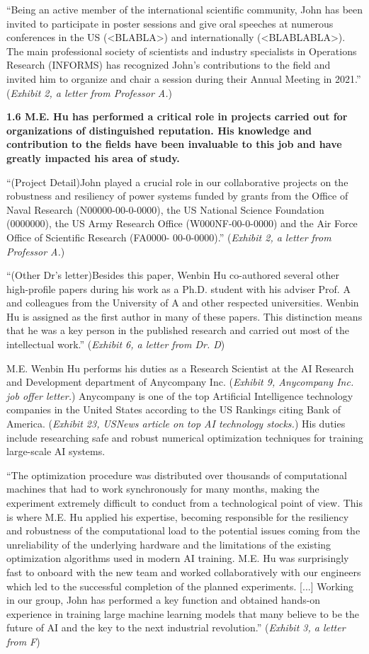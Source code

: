 \documentclass{article}
\begin{document}
“Being an active member of the international scientific community, John has been invited to participate in poster sessions and give oral speeches at numerous conferences in the US (<BLABLA>) and internationally (<BLABLABLA>). The main professional society of scientists and industry specialists in Operations Research (INFORMS) has recognized John’s contributions to the field and invited him to organize and chair a session during their Annual Meeting in 2021.” ({\it Exhibit 2, a letter from Professor A.}) 

{\bf 1.6 M.E. Hu has performed a critical role in projects carried out for organizations of distinguished reputation. His knowledge and contribution to the fields have been invaluable to this job and have greatly impacted his area of study. }

“(Project Detail)John played a crucial role in our collaborative projects on the robustness and resiliency of power systems funded by grants from the Office of Naval Research (N00000-00-0-0000), the US National Science Foundation (0000000), the US Army Research Office (W000NF-00-0-0000) and the Air Force Office of Scientific Research (FA0000- 00-0-0000).” ({\it Exhibit 2, a letter from Professor A.}) 

“(Other Dr's letter)Besides this paper, Wenbin Hu co-authored several other high-profile papers during his work as a Ph.D. student with his adviser Prof. A and colleagues from the University of A and other respected universities. Wenbin Hu is assigned as the first author in many of these papers. This distinction means that he was a key person in the published research and carried out most of the intellectual work.” ({\it Exhibit 6, a letter from Dr. D}) 

M.E. Wenbin Hu performs his duties as a Research Scientist at the AI Research and Development department of Anycompany Inc. ({\it Exhibit 9, Anycompany Inc. job offer letter.}) Anycompany is one of the top Artificial Intelligence technology companies in the United States according to the US Rankings citing Bank of America. ({\it Exhibit 23, USNews article on top AI technology stocks.}) His duties include researching safe and robust numerical optimization techniques for training large-scale AI systems.

“The optimization procedure was distributed over thousands of computational machines that had to work synchronously for many months, making the experiment extremely difficult to conduct from a technological point of view. This is where M.E. Hu applied his expertise, becoming responsible for the resiliency and robustness of the computational load to the potential issues coming from the unreliability of the underlying hardware and the limitations of the existing optimization algorithms used in modern AI training. M.E. Hu was surprisingly fast to onboard with the new team and worked collaboratively with our engineers which led to the successful completion of the planned experiments. [...] Working in our group, John has performed a key function and obtained hands-on experience in training large machine learning models that many believe to be the future of AI and the key to the next industrial revolution.” ({\it Exhibit 3, a letter from F}) 
\end{document}
